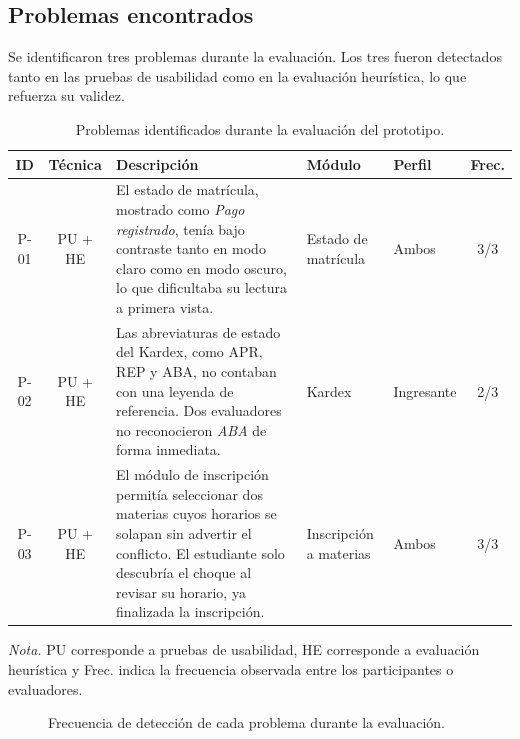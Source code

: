 \subsection{Problemas encontrados}

Se identificaron tres problemas durante la evaluación. Los tres fueron detectados tanto en las pruebas de usabilidad como en la evaluación heurística, lo que refuerza su validez.

\renewcommand{\arraystretch}{1.35}
\begin{table}[H]
\centering
\small
\begin{tabularx}{\textwidth}{|c|c|X|l|l|c|}
\hline
\textbf{ID} & \textbf{Técnica} & \textbf{Descripción} & \textbf{Módulo} & \textbf{Perfil} & \textbf{Frec.} \\
\hline
P-01 & PU + HE & El estado de matrícula, mostrado como \textit{Pago registrado}, tenía bajo contraste tanto en modo claro como en modo oscuro, lo que dificultaba su lectura a primera vista. & Estado de matrícula & Ambos & 3/3 \\
\hline
P-02 & PU + HE & Las abreviaturas de estado del Kardex, como APR, REP y ABA, no contaban con una leyenda de referencia. Dos evaluadores no reconocieron \textit{ABA} de forma inmediata. & Kardex & Ingresante & 2/3 \\
\hline
P-03 & PU + HE & El módulo de inscripción permitía seleccionar dos materias cuyos horarios se solapan sin advertir el conflicto. El estudiante solo descubría el choque al revisar su horario, ya finalizada la inscripción. & Inscripción a materias & Ambos & 3/3 \\
\hline
\end{tabularx}
\caption{Problemas identificados durante la evaluación del prototipo.}\label{tab:eval-problemas}
\end{table}
\renewcommand{\arraystretch}{1}

\noindent\textit{Nota.} PU corresponde a pruebas de usabilidad, HE corresponde a evaluación heurística y Frec. indica la frecuencia observada entre los participantes o evaluadores.

\vspace{0.5cm}
\begin{figure}[H]
    \centering
    \caption{Frecuencia de detección de cada problema durante la evaluación.}
    \label{fig:frecuencia-problemas}
\end{figure}
